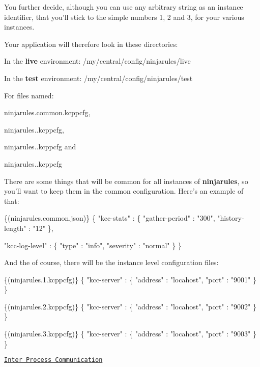 You further decide, although you can use any arbitrary string as an instance identifier, that you'll stick to the simple numbers 1, 2 and 3, for your various instances.

Your application will therefore look in these directories\-:
\begin{DoxyItemize}
\item In the {\bfseries live} environment\-: /my/central/config/ninjarules/live
\item In the {\bfseries test} environment\-: /my/central/config/ninjarules/test
\end{DoxyItemize}

For files named\-:
\begin{DoxyItemize}
\item ninjarules.\-common.\-kcppcfg,
\item ninjarules..\-kcppcfg,
\item ninjarules..\-kcppcfg and
\item ninjarules..\-kcppcfg
\end{DoxyItemize}

There are some things that will be common for all instances of {\bfseries ninjarules}, so you'll want to keep them in the common configuration. Here's an example of that\-: 
\begin{DoxyCode}
\{(ninjarules.common.json)\}
\{
  \textcolor{stringliteral}{"kcc-stats"}     : \{
    \textcolor{stringliteral}{"gather-period"}  : \textcolor{stringliteral}{"300"},
    \textcolor{stringliteral}{"history-length"} : \textcolor{stringliteral}{"12"}
  \},

  \textcolor{stringliteral}{"kcc-log-level"} : \{
    \textcolor{stringliteral}{"type"}           : \textcolor{stringliteral}{"info"},
    \textcolor{stringliteral}{"severity"}       : \textcolor{stringliteral}{"normal"}
  \}
\}
\end{DoxyCode}


And the of course, there will be the instance level configuration files\-: 
\begin{DoxyCode}
\{(ninjarules.1.kcppcfg)\}
\{
  \textcolor{stringliteral}{"kcc-server"}    : \{
    \textcolor{stringliteral}{"address"}        : \textcolor{stringliteral}{"locahost"},
    \textcolor{stringliteral}{"port"}           : \textcolor{stringliteral}{"9001"}
  \}
\}
\end{DoxyCode}
 
\begin{DoxyCode}
\{(ninjarules.2.kcppcfg)\}
\{
  \textcolor{stringliteral}{"kcc-server"}    : \{
    \textcolor{stringliteral}{"address"}        : \textcolor{stringliteral}{"locahost"},
    \textcolor{stringliteral}{"port"}           : \textcolor{stringliteral}{"9002"}
  \}
\}
\end{DoxyCode}
 
\begin{DoxyCode}
\{(ninjarules.3.kcppcfg)\}
\{
  \textcolor{stringliteral}{"kcc-server"}    : \{
    \textcolor{stringliteral}{"address"}        : \textcolor{stringliteral}{"locahost"},
    \textcolor{stringliteral}{"port"}           : \textcolor{stringliteral}{"9003"}
  \}
\}
\end{DoxyCode}


\href{md_inter_process_communication.html}{\tt Inter Process Communication} 